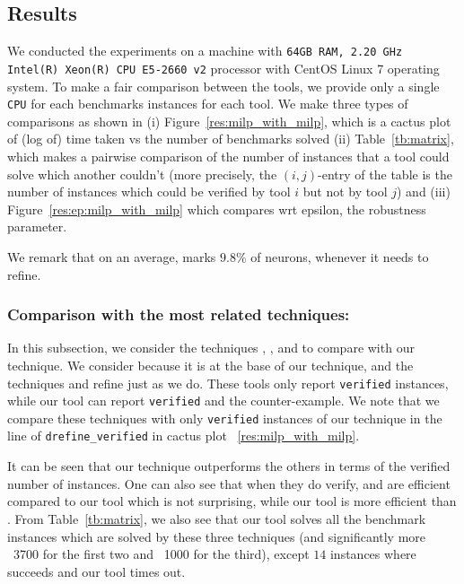\subsection{Results}
We conducted the experiments on a machine with \texttt{64GB RAM, 2.20 GHz Intel(R) Xeon(R) CPU E5-2660 v2}
processor with CentOS Linux 7 operating system. 
To make a fair comparison between the tools, we provide only a single \texttt{CPU} for each benchmarks instances for each tool. 
We make three types of comparisons as shown in (i) Figure~\ref{res:milp_with_milp}, which is a cactus plot of (log of) time taken vs the number of benchmarks solved (ii) Table~\ref{tb:matrix}, which makes a pairwise comparison of the number of instances that a tool could solve which another couldn't  (more precisely, the $(i,j)$-entry of the table is the number of instances which could be verified by tool $i$ but not by tool $j$) and (iii) Figure~\ref{res:ep:milp_with_milp} which compares wrt epsilon, the robustness parameter.

We remark that on an average, \drefine{} marks $9.8\%$ of neurons, whenever it needs to refine.  

\subsubsection{Comparison with the most related techniques:}
In this subsection, we consider the techniques \deeppoly{}, \kpoly{}, and \deepsrgr{} to compare with our technique. 
We consider \deeppoly{} because it is at the base of our technique, and the techniques \kpoly{} and \deepsrgr{} refine \deeppoly{} just as we do. These tools only report \texttt{verified} instances, while our tool can report  \texttt{verified} and the counter-example. We note that we compare these techniques with only \texttt{verified}  instances of our technique in the line of \texttt{drefine\_verified} in cactus plot ~\ref{res:milp_with_milp}. 

It can be seen that our technique outperforms the others in terms of the verified number of instances. One can also see that when they do verify, \deeppoly{} and \kpoly{} are efficient compared to our tool which is not surprising, while our tool is more efficient than \deepsrgr{}. From Table~\ref{tb:matrix}, we also see  that our tool solves all the benchmark instances which are solved by these three techniques (and significantly more ~3700 for the first two and ~1000 for the third), except $14$ instances where \kpoly{} succeeds and our tool times out.

